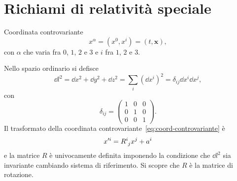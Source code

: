 \chapter{Richiami di relatività speciale}
\label{cha:relativita-speciale}

Coordinata controvariante
\begin{equation}
  \label{eq:coord-controvariante}
  x^{\alpha} = (x^{0},x^{i}) = (t, \bm{x}),
\end{equation}
con $\alpha$ che varia fra $0$, $1$, $2$ e $3$ e $i$ fra $1$, $2$ e $3$.

Nello spazio ordinario si defisce
\begin{equation}
  \dd l^{2}   = \dd x^{2} + \dd y^{2} + \dd z^{2} = \sum_{i} (\dd x^{i})^{2} =
  \delta_{ij}\dd x^{i} \dd x^{j},
\end{equation}
con
\begin{equation}
  \delta_{ij} =
  \begin{pmatrix}
    1 & 0 & 0 \\
    0 & 1 & 0 \\
    0 & 0 & 1
  \end{pmatrix}.
\end{equation}
Il trasformato della coordinata controvariante~\eqref{eq:coord-controvariante} è
\begin{equation}
  x'^{i} = \tensor{R}{^{i}_{j}}x^{j} + a^{i}
\end{equation}
e la matrice $R$ è univocamente definita imponendo la condizione che $\dd l^{2}$
sia invariante cambiando sistema di riferimento.  Si scopre che $R$ è la matrice
di rotazione.

